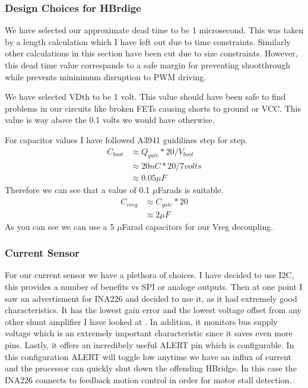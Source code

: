 \documentclass[12pt]{article}
\begin{document}
\subsubsection{Design Choices for HBrdige}
We have selected our approximate dead time to be 1 microsecond. This was taken by a length calculation which I have left out due to time constraints. Similarly other calculations in this section have been cut due to size constraints. However, this dead time value correspands to a safe margin for preventing shootthrough while prevents mininimum disruption to PWM driving.

We have selected VDth to be 1 volt. This value should have been safe to find problems in our circuits like broken FETs causing shorts to ground or VCC. This value is way above the 0.1 volts we would have otherwise.

For capacitor values I have followed A3941 guidilines step for step.  
\begin{align}
C_{boot} &\approx Q_{gate} * 20 / V_{boot}
\\ &\approx 20 nC * 20 / 7 volts
\\ &\approx 0.05 \mu F
\end{align}
Therefore we can see that a value of 0.1 $\mu$Farads is suitable.
\begin{align}
C_{vreg} &\approx C_{gate} * 20
\\ &\approx 2 \mu F
\end{align}
As you can see we can use a 5 $\mu$Farad capacitors for our Vreg decoupling.
\subsubsection{Current Sensor}
For our current sensor we have a plethora of choices. I have decided to use I2C, this provides a number of benefits vs SPI or analoge outputs. Then at one point I saw an advertisment for INA226 and decided to use it, as it had extremely good characteristics. It has the lowest gain error and the lowest voltage offset from any other shunt amplifier I have looked at . In addition, it monitors bus supply voltage which is an extremely important characteristic since it saves even more pins. Lastly, it offers an incredibely useful ALERT pin which is configurable. In this configuration ALERT will toggle low anytime we have an influx of current and the processor can quickly shut down the offending HBridge. In this case the INA226 connects to feedback motion control in order for motor stall detection. 
\end{document}
